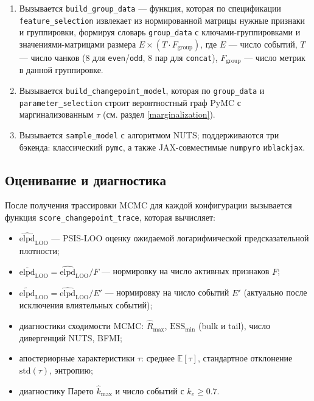 \documentclass[14pt]{mmcs_article}
\begin{document}
\begin{enumerate}
	\item Вызывается \texttt{build\_group\_data} — функция,
	которая по спецификации \texttt{feature\_selection}
	извлекает из нормированной матрицы нужные признаки
	и группировки, формируя словарь
	\texttt{group\_data} с \linebreak ключами-группировками и
	значениями-матрицами размера\linebreak
	$E \times (T \cdot F_{\text{group}})$, где $E$ —
	число событий, $T$ — число чанков (8 для
	\texttt{even}/\texttt{odd}, 8 пар для
	\texttt{concat}), $F_{\text{group}}$ — число
	метрик в данной группировке.
	\item Вызывается \texttt{build\_changepoint\_model},
	которая по \texttt{group\_data} и \linebreak
	\texttt{parameter\_selection} строит вероятностный
	граф PyMC с маргинализованным $\tau$ (см. раздел
	\ref{marginalization}).
	\item Вызывается \texttt{sample\_model} с алгоритмом
	NUTS; поддерживаются три бэкенда: классический
	\texttt{pymc}, а также JAX-совместимые
	\texttt{numpyro} и\linebreak \texttt{blackjax}.
\end{enumerate}



\subsection*{Оценивание и диагностика}

После получения трассировки MCMC для каждой конфигурации
вызывается функция \texttt{score\_changepoint\_trace},
которая вычисляет:

\begin{itemize}
	\item $\widehat{\mathrm{elpd}}_{\mathrm{LOO}}$ —
	PSIS-LOO оценку ожидаемой логарифмической
	предсказательной плотности;
	\item $\overline{\mathrm{elpd}}_{\mathrm{LOO}} =
	\widehat{\mathrm{elpd}}_{\mathrm{LOO}} / F$ —
	нормировку на число активных признаков $F$;
	\item $\widetilde{\mathrm{elpd}}_{\mathrm{LOO}} =
	\widehat{\mathrm{elpd}}_{\mathrm{LOO}} / E'$ —
	нормировку на число событий $E'$ (актуально после
	исключения влиятельных событий);
	\item диагностики сходимости MCMC: $\hat{R}_{\max}$,
	$\mathrm{ESS}_{\min}$ (bulk и tail), число
	дивергенций NUTS, BFMI;
	\item апостериорные характеристики $\tau$: среднее
	$\mathbb{E}[\tau]$, стандартное отклонение
	$\mathrm{std}(\tau)$, энтропию;
	\item диагностику Парето $\hat{k}_{\max}$ и число событий
	с $\hat{k}_e \geq 0.7$.
\end{itemize}
\end{document}
